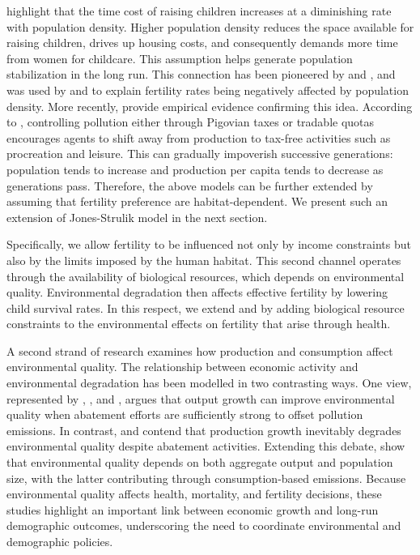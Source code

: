 \documentclass[11pt]{article}
\begin{document}
\citet{dao25} highlight that the time cost of raising children increases at a diminishing rate with population density. Higher
population density reduces the space available for raising children, drives up housing costs, and consequently demands more time
from women for childcare. This assumption helps generate population stabilization in the long run.
This connection has been pioneered by \citet{goodsell} and \citet{thompson}, and was used by \citet{DELACROIX2012271} and
\citet{DAO2013442} to explain fertility rates being negatively affected by population density. More recently,
\citet{DELACROIX201713} provide empirical evidence confirming this idea. According to \citet{DELACROIX2012271}, controlling
pollution either through Pigovian taxes or tradable quotas encourages agents to shift away from production to tax-free activities
such as procreation and leisure. This can gradually impoverish successive generations: population tends to increase and production
per capita tends to decrease as generations pass.
Therefore, the above models can be further extended by assuming that  fertility preference are habitat-dependent. We present such an extension of Jones-Strulik model in the next section.


Specifically, we allow fertility to be influenced not only by income constraints but also by the limits imposed by the human habitat. This second channel operates through the availability of biological resources, which depends on environmental quality. Environmental degradation then affects effective fertility by lowering child survival rates. In this respect, we extend \citet{mari10} and \citet{Varvarigos2013} by adding biological resource constraints to the environmental effects on fertility that arise through health.


A second strand of research examines how production and consumption affect environmental quality. The relationship between economic activity and environmental degradation has been modelled in two contrasting ways. One view, represented by \citet{raffin14}, \citet{econ2008}, and \citet{marsiglio2018}, argues that output growth can improve environmental quality when abatement efforts are sufficiently strong to offset pollution emissions. In contrast, \citet{Varvarigos2013} and \citet{pautrel08} contend that production growth inevitably degrades environmental quality despite abatement activities. Extending this debate, \citet{mar2017} show that environmental quality depends on both aggregate output and population size, with the latter contributing through consumption-based emissions. Because environmental quality affects health, mortality, and fertility decisions, these studies highlight an important link between economic growth and long-run demographic outcomes, underscoring the need to coordinate environmental and demographic policies.
\end{document}
